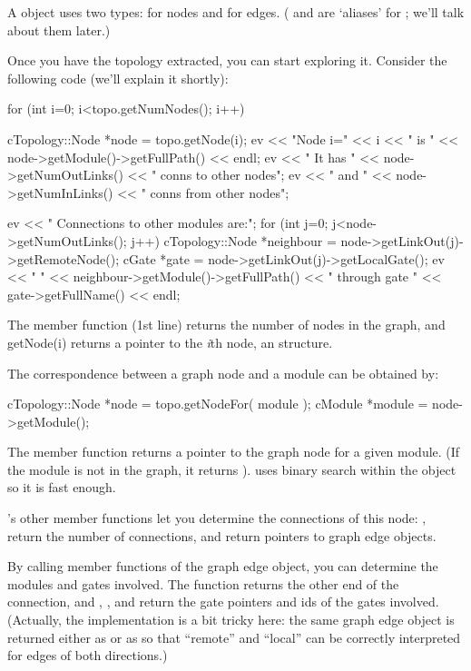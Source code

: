 A  object uses two types:  for
nodes and  for edges. ( and
 are `aliases' for ; we'll
talk about them later.)

Once you have the topology extracted, you can start exploring
it. Consider the following code (we'll explain it shortly):

\begin{cpp}
for (int i=0; i<topo.getNumNodes(); i++)
{
  cTopology::Node *node = topo.getNode(i);
  ev << "Node i=" << i << " is " << node->getModule()->getFullPath() << endl;
  ev << " It has " << node->getNumOutLinks() << " conns to other nodes\n";
  ev << " and " << node->getNumInLinks() << " conns from other nodes\n";

  ev << " Connections to other modules are:\n";
  for (int j=0; j<node->getNumOutLinks(); j++)
  {
    cTopology::Node *neighbour = node->getLinkOut(j)->getRemoteNode();
    cGate *gate = node->getLinkOut(j)->getLocalGate();
    ev << " " << neighbour->getModule()->getFullPath()
       << " through gate " << gate->getFullName() << endl;
  }
}
\end{cpp}

The  member function (1st line) returns the number of
nodes in the graph, and getNode(i) returns a pointer to the \textit{i}th
node, an  structure.


The correspondence between a graph node and a module can be obtained
by:

\begin{cpp}
cTopology::Node *node = topo.getNodeFor( module );
cModule *module = node->getModule();
\end{cpp}


The  member function returns a pointer to the graph
node for a given module. (If the module is not in the graph, it
returns ).  uses binary search within the
 object so it is fast enough.


's other member functions let you determine the
connections of this node: ,  return
the number of connections,  and
 return pointers to graph edge objects.


By calling member functions of the graph edge object, you can
determine the modules and gates involved. The 
function returns the other end of the connection, and
, ,  and
 return the gate pointers and ids of the gates
involved. (Actually, the implementation is a bit tricky here: the same
graph edge object  is returned either as
 or as  so that ``remote''
and ``local'' can be correctly interpreted for edges of both
directions.)





